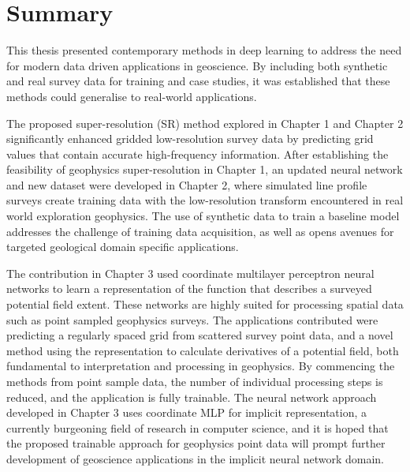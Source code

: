 \documentclass[manuscript.tex]{subfiles}
\begin{document}
\setcounter{chapter}{1}


\section{Summary}
This thesis presented contemporary methods in deep learning to address the need for modern data driven applications in geoscience.
By including both synthetic and real survey data for training and case studies, it was established that these methods could generalise to real-world applications.

The proposed super-resolution (SR) method explored in Chapter 1 and Chapter 2 significantly enhanced gridded low-resolution survey data by predicting grid values that contain accurate high-frequency information.
After establishing the feasibility of geophysics super-resolution in Chapter 1, an updated neural network and new dataset were developed in Chapter 2, where simulated line profile surveys create training data with the low-resolution transform encountered in real world exploration geophysics.
The use of synthetic data to train a baseline model addresses the challenge of training data acquisition, as well as opens avenues for targeted geological domain specific applications.

The contribution in Chapter 3 used coordinate multilayer perceptron neural networks to learn a representation of the function that describes a surveyed potential field extent.
These networks are highly suited for processing spatial data such as point sampled geophysics surveys.
The applications contributed were predicting a regularly spaced grid from scattered survey point data, and a novel method using the representation to calculate derivatives of a potential field, both fundamental to interpretation and processing in geophysics.
By commencing the methods from point sample data, the number of individual processing steps is reduced, and the application is fully trainable.
The neural network approach developed in Chapter 3 uses coordinate MLP for implicit representation, a currently burgeoning field of research in computer science, and it is hoped that the proposed trainable approach for geophysics point data will prompt further development of geoscience applications in the implicit neural network domain.
\end{document}
